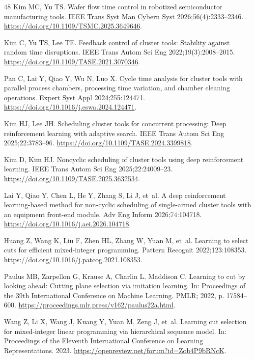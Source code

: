 \begin{thebibliography}{48}
Kim MC, Yu TS. Wafer flow time control in robotized semiconductor manufacturing tools.
IEEE Trans Syst Man Cybern Syst 2026;56(4):2333--2346.
\url{https://doi.org/10.1109/TSMC.2025.3649646}.

Kim C, Yu TS, Lee TE. Feedback control of cluster tools: Stability against random time disruptions.
IEEE Trans Autom Sci Eng 2022;19(3):2008--2015.
\url{https://doi.org/10.1109/TASE.2021.3070346}.

Pan C, Lai Y, Qiao Y, Wu N, Luo X. Cycle time analysis for cluster tools with parallel process chambers, processing time variation, and chamber cleaning operations.
Expert Syst Appl 2024;255:124471.
\url{https://doi.org/10.1016/j.eswa.2024.124471}.

Kim HJ, Lee JH. Scheduling cluster tools for concurrent processing: Deep reinforcement learning with adaptive search.
IEEE Trans Autom Sci Eng 2025;22:3783--96.
\url{https://doi.org/10.1109/TASE.2024.3399818}.

Kim D, Kim HJ. Noncyclic scheduling of cluster tools using deep reinforcement learning.
IEEE Trans Autom Sci Eng 2025;22:24009--23.
\url{https://doi.org/10.1109/TASE.2025.3632534}.

Lai Y, Qiao Y, Chen L, He Y, Zhang S, Li J, et~al. A deep reinforcement learning-based method for non-cyclic scheduling of single-armed cluster tools with an equipment front-end module.
Adv Eng Inform 2026;74:104718.
\url{https://doi.org/10.1016/j.aei.2026.104718}.

Huang Z, Wang K, Liu F, Zhen HL, Zhang W, Yuan M, et~al. Learning to select cuts for efficient mixed-integer programming.
Pattern Recognit 2022;123:108353.
\url{https://doi.org/10.1016/j.patcog.2021.108353}.

Paulus MB, Zarpellon G, Krause A, Charlin L, Maddison C. Learning to cut by looking ahead: Cutting plane selection via imitation learning.
In: Proceedings of the 39th International Conference on Machine Learning. PMLR; 2022, p. 17584--600.
\url{https://proceedings.mlr.press/v162/paulus22a.html}.

Wang Z, Li X, Wang J, Kuang Y, Yuan M, Zeng J, et~al. Learning cut selection for mixed-integer linear programming via hierarchical sequence model.
In: Proceedings of the Eleventh International Conference on Learning Representations. 2023.
\url{https://openreview.net/forum?id=Zob4P9bRNcK}.


\end{thebibliography}
